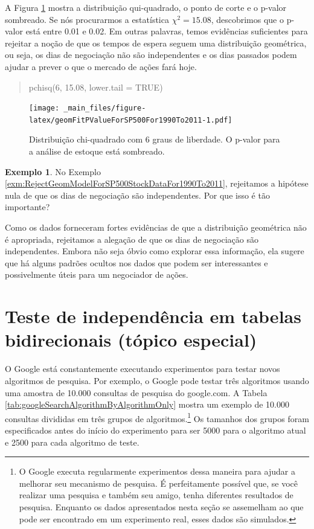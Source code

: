 \documentclass[
]{book}
\theoremstyle{definition}
\theoremstyle{definition}
\newtheorem{example}{Exemplo}[chapter]
\theoremstyle{definition}
\theoremstyle{definition}
\theoremstyle{remark}
\begin{document}
A Figura \ref{fig:geomFitPValueForSP500For1990To2011} mostra a distribuição qui-quadrado, o ponto de corte e o p-valor sombreado. Se nós procurarmos a estatística \(\chi^2=15.08\), descobrimos que o p-valor está entre 0.01 e 0.02. Em outras palavras, temos evidências suficientes para rejeitar a noção de que os tempos de espera seguem uma distribuição geométrica, ou seja, os dias de negociação não são independentes e os dias passados podem ajudar a prever o que o mercado de ações fará hoje.

\begin{quote}
pchisq(6, 15.08, lower.tail = TRUE)
\end{quote}

\begin{figure}
\centering
\texttt{[image: \_main\_files/figure-latex/geomFitPValueForSP500For1990To2011-1.pdf]}
\caption{\label{fig:geomFitPValueForSP500For1990To2011}Distribuição chi-quadrado com 6 graus de liberdade. O p-valor para a análise de estoque está sombreado.}
\end{figure}

\begin{example}
\protect\hypertarget{exm:unnamed-chunk-250}{}{\label{exm:unnamed-chunk-250} }No Exemplo \ref{exm:RejectGeomModelForSP500StockDataFor1990To2011}, rejeitamos a hipótese nula de que os dias de negociação são independentes. Por que isso é tão importante?
\end{example}

Como os dados forneceram fortes evidências de que a distribuição geométrica não é apropriada, rejeitamos a alegação de que os dias de negociação são independentes. Embora não seja óbvio como explorar essa informação, ela sugere que há alguns padrões ocultos nos dados que podem ser interessantes e possivelmente úteis para um negociador de ações.

\hypertarget{independenceTestBidirectionalTables}{%
\section{Teste de independência em tabelas bidirecionais (tópico especial)}\label{independenceTestBidirectionalTables}}

O Google está constantemente executando experimentos para testar novos algoritmos de pesquisa. Por exemplo, o Google pode testar três algoritmos usando uma amostra de 10.000 consultas de pesquisa do google.com. A Tabela \ref{tab:googleSearchAlgorithmByAlgorithmOnly} mostra um exemplo de 10.000 consultas divididas em três grupos de algoritmos.\footnote{O Google executa regularmente experimentos dessa maneira para ajudar a melhorar seu mecanismo de pesquisa. É perfeitamente possível que, se você realizar uma pesquisa e também seu amigo, tenha diferentes resultados de pesquisa. Enquanto os dados apresentados nesta seção se assemelham ao que pode ser encontrado em um experimento real, esses dados são simulados.} Os tamanhos dos grupos foram especificados antes do início do experimento para ser 5000 para o algoritmo atual e 2500 para cada algoritmo de teste.
\end{document}
